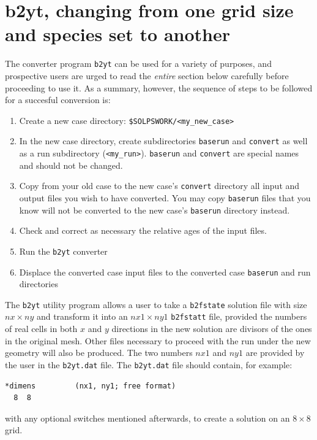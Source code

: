 \documentclass[a4paper,10pt]{report}
\begin{document}
\newpage
\section{b2yt, changing from one grid size and species set to another}
\label{sec:b2yt}

The converter program {\tt b2yt} can be used for a variety of purposes, and
prospective users are urged to read the {\em entire} section below carefully
before proceeding to use it. As a summary, however, the sequence of steps to
be followed for a succesful conversion is:
\begin{enumerate}
  \item[1] Create a new case directory: {\tt \$SOLPSWORK/<my\_new\_case>}
  \item[2] In the new case directory, create subdirectories {\tt baserun} and {\tt convert} as well as a run subdirectory ({\tt <my\_run>}). {\tt baserun} and {\tt convert} are special names and should not be changed.
  \item[3] Copy from your old case to the new case's {\tt convert} directory all input and output files you wish to have converted. You may copy {\tt baserun} files that you know will not be converted to the new case's {\tt baserun} directory instead.
  \item[4] Check and correct as necessary the relative ages of the input files.
  \item[5] Run the {\tt b2yt} converter
  \item[6] Displace the converted case input files to the converted case {\tt baserun} and run directories
\end{enumerate}

The {\tt b2yt} utility program allows a user to take a {\tt b2fstate} solution file
with size $nx \times ny$ and transform it into an $nx1 \times ny1$ {\tt b2fstatt}
file, provided the numbers of real cells in both $x$ and
$y$ directions in the new solution are divisors of the ones in the original mesh. Other
files necessary to proceed with the run under the new geometry will also be produced. The
two numbers $nx1$ and $ny1$ are provided by the user in the {\tt b2yt.dat}
file. The {\tt b2yt.dat} file should contain, for example:
\begin{verbatim}
*dimens         (nx1, ny1; free format)
  8  8
\end{verbatim}
with any optional switches mentioned afterwards, to create a solution on an $8 \times 8$ grid.
\end{document}
